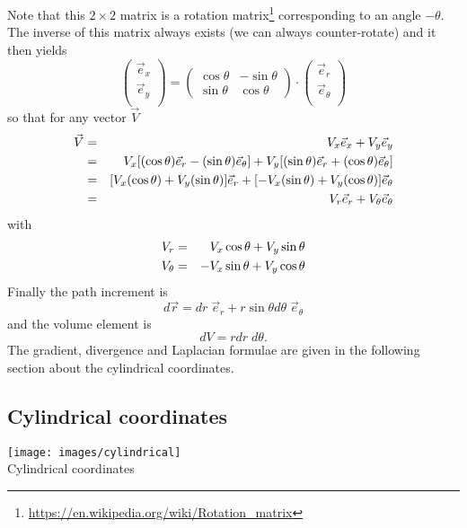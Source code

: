Note that this $2\times 2$ matrix is a 
rotation matrix\footnote{\url{https://en.wikipedia.org/wiki/Rotation_matrix}}
corresponding to an angle $-\theta$. The inverse of this matrix always exists 
(we can always counter-rotate) and it then yields
\[
\left(
\begin{array}{c}
{\vec e}_{x} \\
{\vec e}_{y} \\
\end{array}
\right)
=
\left(
\begin{array}{cc}
\cos \theta & -\sin \theta \\
\sin \theta & \cos \theta
\end{array}
\right)
\cdot
\left(
\begin{array}{c}
{\vec e}_{r} \\
{\vec e}_{\theta} \\
\end{array}
\right)
\]
so that for any vector ${\vec V}$
\begin{eqnarray}
{\vec V} 
&=& V_x {\vec e}_x  + V_y {\vec e}_y \nonumber\\
&=& V_x [(\cos \theta) {\vec e}_r - (\sin \theta) {\vec e}_\theta]  + 
    V_y [(\sin \theta) {\vec e}_r + (\cos \theta){\vec e}_\theta] \nonumber\\
&=& [V_x (\cos \theta) + V_y (\sin \theta)] {\vec e}_r +
[- V_x(\sin \theta) + V_y (\cos \theta)]{\vec e}_\theta \nonumber\\
&=& V_r \vec{e}_r  + V_\theta \vec{e}_\theta \nonumber
\end{eqnarray}
with
\begin{eqnarray}
V_r &=& V_x \cos \theta + V_y \sin \theta \nonumber\\
V_\theta &=& - V_x \sin \theta + V_y \cos \theta \nonumber
\end{eqnarray}
Finally the path increment is
\[
d\vec{r} = dr \; {\vec e}_r  + r \sin\theta d\theta \; {\vec e}_\theta
\]
and the volume element is 
\[
dV= r dr \; d\theta.
\]
The gradient, divergence and Laplacian formulae are given in the following section about 
the cylindrical coordinates.


\subsection{Cylindrical coordinates \label{ss:cylcoord}}

\begin{center}
\texttt{[image: images/cylindrical]}\\
{\captionfont Cylindrical coordinates}
\end{center}

